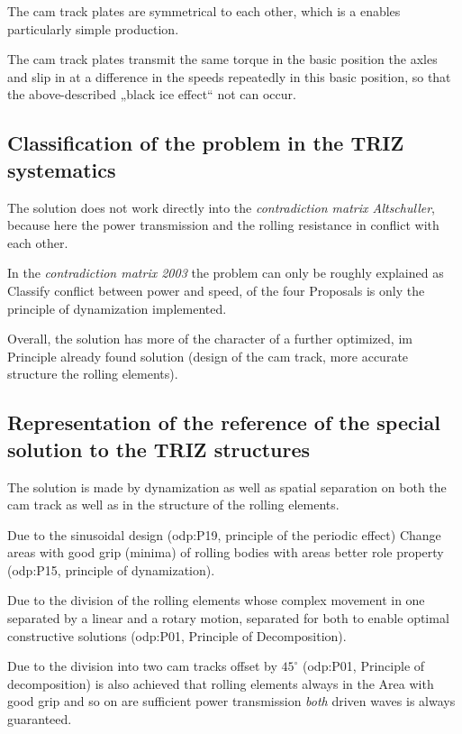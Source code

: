 \documentclass[11pt,a4paper]{article}
\begin{document}
The cam track plates are symmetrical to each other, which is a enables
particularly simple production.

The cam track plates transmit the same torque in the basic position the axles
and slip in at a difference in the speeds repeatedly in this basic position,
so that the above-described „black ice effect“ not can occur.

\subsection{Classification of the problem in the TRIZ systematics}

The solution does not work directly into the \emph{contradiction matrix
  Altschuller}, because here the power transmission and the rolling resistance
in conflict with each other.

In the \emph{contradiction matrix 2003} the problem can only be roughly
explained as Classify conflict between power and speed, of the four Proposals
is only the principle of dynamization implemented.

Overall, the solution has more of the character of a further optimized, im
Principle already found solution (design of the cam track, more accurate
structure the rolling elements).

\subsection{Representation of the reference of the special solution to the
  TRIZ structures}

The solution is made by dynamization as well as spatial separation on both the
cam track as well as in the structure of the rolling elements.

Due to the sinusoidal design (odp:P19, principle of the periodic effect)
Change areas with good grip (minima) of rolling bodies with areas better role
property (odp:P15, principle of dynamization).

Due to the division of the rolling elements whose complex movement in one
separated by a linear and a rotary motion, separated for both to enable
optimal constructive solutions (odp:P01, Principle of Decomposition).

Due to the division into two cam tracks offset by $45^\circ$ (odp:P01,
Principle of decomposition) is also achieved that rolling elements always in
the Area with good grip and so on are sufficient power transmission
\emph{both} driven waves is always guaranteed.
\end{document}
